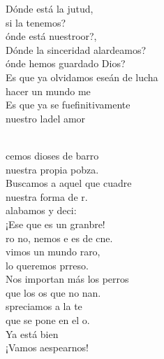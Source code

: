 \documentclass[12pt]{article}
\begin{document}
\begin{multicols*}{2}
\begin{cancion}%
	\begin{chorus}%
	Dónde está la jutud,\\
si la tenemos?\\
	ónde está nuestroor?,\\
	Dónde la sinceridad  alardeamos?\\
	ónde hemos guardado Dios?\\
	Es que ya olvidamos eseán de lucha\\
	 hacer un mundo me\\
	Es que ya se fuefinitivamente\\
	nuestro ladel amor\\
	\end{chorus}%
	\jump\\
	cemos dioses de barro\\
	 nuestra propia pobza.\\
Buscamos a aquel que cuadre\\
	 nuestra forma de r.\\
	 alabamos y deci:\\
	¡Ese que es un granbre! \\
	ro no, nemos e es de cne.\\
	vimos un mundo raro,\\
	lo queremos prreso.\\
Nos importan más los perros\\
	que los os que no nan. \\
	spreciamos a la te\\
	que se pone en el o.\\
	Ya está bien\\
	¡Vamos aespearnos!\\
\end{cancion}%


\end{multicols*}
\end{document}
